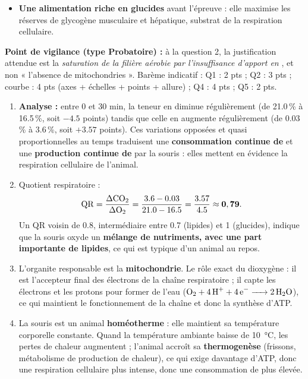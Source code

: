 \documentclass[11pt]{article}
\newcommand{\cle}[1]{{\popxbold\color{popdark}#1}}
\begin{document}
\begin{corrige}
\begin{enumerate}
\begin{itemize}
\item \textbf{Une alimentation riche en glucides} avant l'épreuve : elle maximise les réserves de glycogène musculaire et hépatique, substrat de la respiration cellulaire.
\end{itemize}
\end{enumerate}
\textbf{Point de vigilance (type Probatoire) :} à la question 2, la justification attendue est la \emph{saturation de la filière aérobie par l'insuffisance d'apport en }, et non « l'absence de mitochondries ». Barème indicatif : Q1 : 2 pts ; Q2 : 3 pts ; courbe : 4 pts (axes + échelles + points + allure) ; Q4 : 4 pts ; Q5 : 2 pts.
\end{corrige}

\begin{corrige}
\begin{enumerate}
\item \textbf{Analyse :} entre 0 et 30 min, la teneur en  diminue régulièrement (de \num{21,0}\,\% à \num{16,5}\,\%, soit $-\num{4,5}$ points) tandis que celle en  augmente régulièrement (de \num{0,03}\,\% à \num{3,6}\,\%, soit $+\num{3,57}$ points). Ces variations opposées et quasi proportionnelles au temps traduisent une \textbf{consommation continue de } et une \textbf{production continue de } par la souris : elles mettent en évidence la respiration cellulaire de l'animal.
\item Quotient respiratoire :
\[ \mathrm{QR} = \frac{\Delta \ce{CO2}}{\Delta \ce{O2}} = \frac{\num{3,6} - \num{0,03}}{\num{21,0} - \num{16,5}} = \frac{\num{3,57}}{\num{4,5}} \approx \mathbf{0,79}. \]
Un QR voisin de \num{0,8}, intermédiaire entre \num{0,7} (lipides) et 1 (glucides), indique que la souris oxyde un \textbf{mélange de nutriments, avec une part importante de lipides}, ce qui est typique d'un animal au repos.
\item L'organite responsable est la \textbf{mitochondrie}. Le rôle exact du dioxygène : il est l'\cle{accepteur final des électrons} de la chaîne respiratoire ; il capte les électrons et les protons pour former de l'eau ($\ce{O2 + 4 H+ + 4 e- -> 2 H2O}$), ce qui maintient le fonctionnement de la chaîne et donc la synthèse d'ATP.
\item La souris est un animal \textbf{homéotherme} : elle maintient sa température corporelle constante. Quand la température ambiante baisse de \SI{10}{\degreeCelsius}, les pertes de chaleur augmentent ; l'animal accroît sa \textbf{thermogenèse} (frissons, métabolisme de production de chaleur), ce qui exige davantage d'ATP, donc une respiration cellulaire plus intense, donc une consommation de  plus élevée.

\end{enumerate}
\end{corrige}
\end{document}
